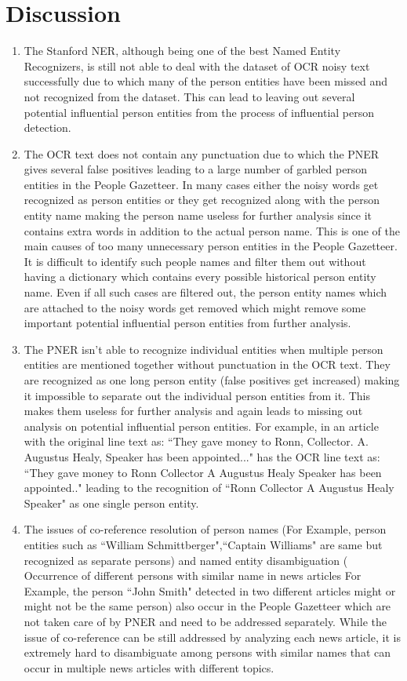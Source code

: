 \section{Discussion}
\label{gaz:discussion}
\begin{enumerate}
\item The Stanford NER, although being one of the best Named Entity Recognizers, is still not able to deal with the dataset of OCR noisy text successfully due to which many of the person entities have been missed and not recognized from the dataset. This can lead to leaving out several potential influential person entities from the process of influential person detection.

\item The OCR text does not contain any punctuation due to which the PNER gives several false positives leading to a large number of garbled person entities in the People Gazetteer. In many cases either the noisy words get recognized as person entities or they get recognized along with the person entity name making the person name useless for further analysis since it contains extra words in addition to the actual person name. This is one of the main causes of too many unnecessary person entities in the People Gazetteer. It is difficult to identify such people names and filter them out without having a dictionary which contains every possible historical person entity name. Even if all such cases are filtered out, the person entity names which are attached to the noisy words get removed which might remove some important potential influential person entities from further analysis.

\item 
The PNER isn't able to recognize individual entities when multiple person entities are mentioned together without punctuation in the OCR text. They are recognized as one long person entity (false positives get increased) making it impossible to separate out the individual person entities from it. This makes them useless for further analysis and again leads to missing out analysis on potential influential person entities.
For example, in an article with the original line text as: ``They gave money to Ronn, Collector. A. Augustus Healy, Speaker has been appointed..." has the OCR line text as: ``They gave money to Ronn Collector A Augustus Healy Speaker has been appointed.." leading to the recognition of ``Ronn Collector A Augustus Healy Speaker" as one single person entity.

\item
The issues of co-reference resolution of person names (For Example, person entities such as ``William Schmittberger",``Captain Williams" are same but recognized as separate persons) and named entity disambiguation ( Occurrence of different persons with similar name in news articles For Example, the person ``John Smith" detected in two different articles might or might not be the same person) also occur in the People Gazetteer which are not taken care of by PNER and need to be addressed separately. While the issue of co-reference can be still addressed by analyzing each news article, it is extremely hard to disambiguate among persons with similar names that can occur in multiple news articles with different topics.  



\end{enumerate}
